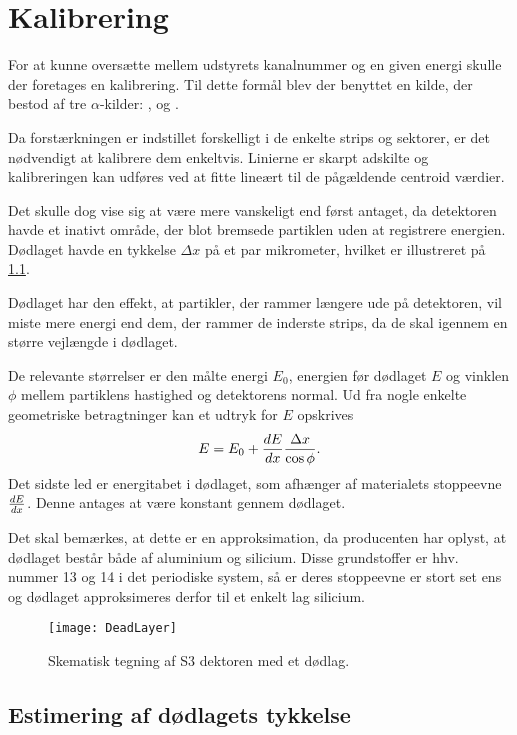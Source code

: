 \chapter{Kalibrering}
\label{cha:kalibrering}

For at kunne oversætte mellem udstyrets kanalnummer og en given energi skulle der foretages en
kalibrering. Til dette formål blev der benyttet en kilde, der bestod af tre $\alpha$-kilder:
,  og .

Da forstærkningen er indstillet forskelligt i de enkelte strips og sektorer, er det nødvendigt at
kalibrere dem enkeltvis. Linierne er skarpt adskilte og kalibreringen kan udføres ved at fitte
lineært til de pågældende centroid værdier.

Det skulle dog vise sig at være mere vanskeligt end først antaget, da detektoren havde et inativt
område, der blot bremsede partiklen uden at registrere energien. Dødlaget havde en tykkelse
$\Delta x$ på et par mikrometer, hvilket er illustreret på \cref{fig:deadLayer}.

Dødlaget har den effekt, at partikler, der rammer længere ude på detektoren, vil miste mere energi
end dem, der rammer de inderste strips, da de skal igennem en større vejlængde i dødlaget.

De relevante størrelser er den målte energi $E_{0}$, energien før dødlaget $E$ og vinklen $\phi$ mellem
partiklens hastighed og detektorens normal. Ud fra nogle enkelte geometriske betragtninger kan et
udtryk for $E$ opskrives
\begin{equation}
  \label{eq:deadE}
  E = E_{0} + \frac{d E}{d x} \frac{\Delta x}{\cos \phi}  .
\end{equation}
Det sidste led er energitabet i dødlaget, som afhænger af materialets stoppeevne $\frac{d E}{d x}$. Denne
antages at være konstant gennem dødlaget.

Det skal bemærkes, at dette er en approksimation, da producenten har oplyst, at dødlaget består både
af aluminium og silicium. Disse grundstoffer er hhv. nummer 13 og 14 i det periodiske system, så er
deres stoppeevne er stort set ens og dødlaget approksimeres derfor til et enkelt lag silicium.
\begin{figure}[h]
  \centering
  \texttt{[image: DeadLayer]}
  \caption{Skematisk tegning af S3 dektoren med et dødlag.}
  \label{fig:deadLayer}
\end{figure}

\section{Estimering af dødlagets tykkelse}
\label{sec:dodlag}

